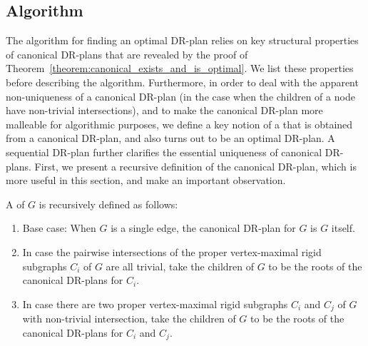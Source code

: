 

\subsection{Algorithm}
\label{sec:DRP:algo}

The algorithm for finding an optimal DR-plan relies on key structural properties of canonical DR-plans that are revealed by the proof of Theorem~\ref{theorem:canonical_exists_and_is_optimal}. We list these properties before describing the algorithm. Furthermore, in order to deal with the apparent non-uniqueness of a canonical DR-plan (in the case when the children of a node have non-trivial intersections), and to make the canonical DR-plan more malleable for algorithmic purposes, we define a key notion of a  that is obtained from a canonical DR-plan, and also turns out to be an optimal DR-plan. A sequential DR-plan further clarifies the essential uniqueness of canonical DR-plans. First, we present a recursive definition of the canonical DR-plan, which is more useful in this section, and make an important observation.

\begin{definition}
\label{def:canonical_drp_rec}
    A  of $G$ is recursively defined as follows:
    \begin{enumerate}
        \item Base case: When $G$ is a single edge, the canonical DR-plan for $G$ is $G$ itself.
        \item In case the pairwise intersections of the proper vertex-maximal rigid subgraphs $C_i$ of $G$  are all trivial, take the children of $G$ to be the roots of the canonical DR-plans for $C_i$.
        \item In case there are two proper vertex-maximal rigid subgraphs $C_i$ and $C_j$ of $G$ with non-trivial intersection, take the children of $G$ to be the roots of the canonical DR-plans for $C_i$ and $C_j$.
    \end{enumerate}
\end{definition}

